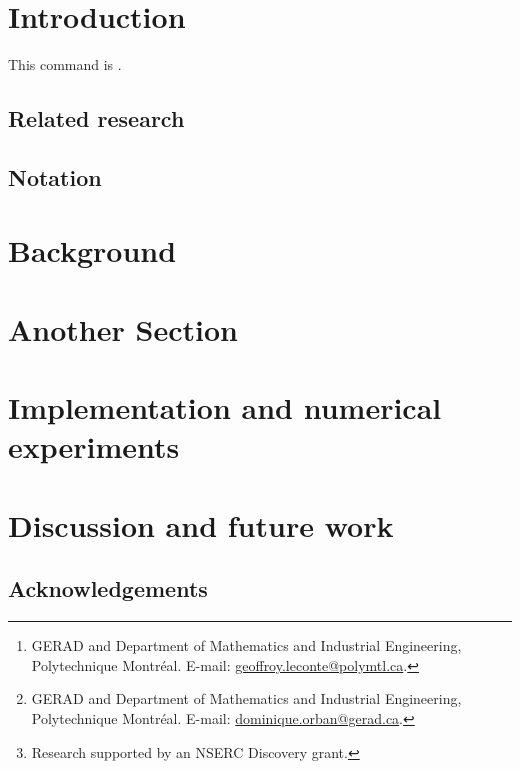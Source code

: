 \documentclass[10pt]{article}
\title{\papertitle}
\author{%
  Author One\footnote{%
    GERAD and Department of Mathematics and Industrial Engineering, Polytechnique Montr\'eal. E-mail: \href{mailto:geoffroy.leconte@polymtl.ca}{geoffroy.leconte@polymtl.ca}.
  }
  \and
  Dominique Orban\footnote{%
    GERAD and Department of Mathematics and Industrial Engineering, Polytechnique Montr\'eal. E-mail: \href{mailto:dominique.orban@gerad.ca}{dominique.orban@gerad.ca}.
  }
  \thanks{Research supported by an NSERC Discovery grant.}
}
\begin{document}
\maketitle
\thispagestyle{mytitlepage}

\begin{abstract}
\end{abstract}


\pagestyle{myheadings}

\section{Introduction}%
\label{sec:introduction}

This command is \notdefined.

\subsection*{Related research}


\subsection*{Notation}


\section{Background}%
\label{sec:background}


\section{Another Section}%
\label{sec:another-section}


\section{Implementation and numerical experiments}%
\label{sec:numerical}


\section{Discussion and future work}%
\label{sec:discussion}


\small
\subsection*{Acknowledgements}




\normalsize
\end{document}
